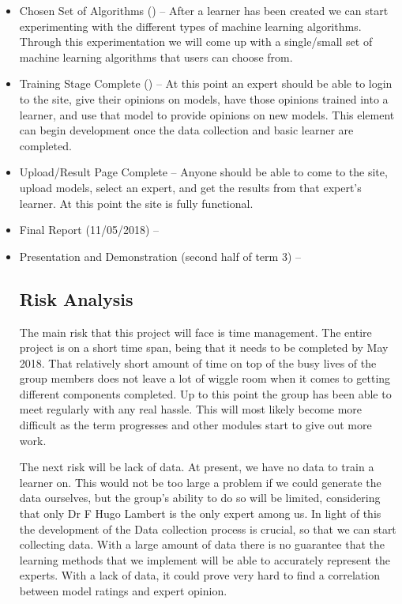 \documentclass[11pt]{article} %
\numberwithin{equation}{section}
\begin{document}
\begin{itemize}
\item Chosen Set of Algorithms () – After a learner has been created we can start experimenting with the different types of machine learning algorithms. Through this experimentation we will come up with a single/small set of machine learning algorithms that users can choose from.

\item Training Stage Complete () – At this point an expert should be able to login to the site, give their opinions on models, have those opinions trained into a learner, and use that model to provide opinions on new models. This element can begin development once the data collection and basic learner are completed.

\item Upload/Result Page Complete – Anyone should be able to come to the site, upload models, select an expert, and get the results from that expert’s learner. At this point the site is fully functional.

\item Final Report (11/05/2018) –

\item Presentation and Demonstration (second half of term 3) –

\subsection{Risk Analysis}

\quad The main risk that this project will face is time management. The entire project is on a short time span, being that it needs to be completed by May 2018. That relatively short amount of time on top of the busy lives of the group members does not leave a lot of wiggle room when it comes to getting different components completed. Up to this point the group has been able to meet regularly with any real hassle. This will most likely become more difficult as the term progresses and other modules start to give out more work. \par

\quad The next risk will be lack of data. At present, we have no data to train a learner on. This would not be too large a problem if we could generate the data ourselves, but the group’s ability to do so will be limited, considering that only Dr F Hugo Lambert is the only expert among us. In light of this the development of the Data collection process is crucial, so that we can start collecting data. With a large amount of data there is no guarantee that the learning methods that we implement will be able to accurately represent the experts. With a lack of data, it could prove very hard to find a correlation between model ratings and expert opinion.\par


\end{itemize}
\end{document}

